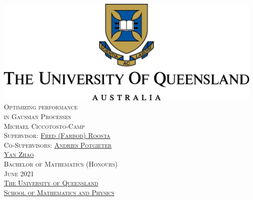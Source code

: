 \documentclass[11pt]{amsart}
\theoremstyle{remark}
\begin{document}
\thispagestyle{empty}
\begin{center}
	\includegraphics{university.png} \\
	\vspace{3cm}
	{\LARGE\textsc{Optimizing performance \\ in Gaussian Processes}} \\
	\vspace{0.3cm}
	{\textsc{Michael Ciccotosto-Camp}} \\
	\vspace{1cm}
	{\textsc{Supervisor: \href{https://people.smp.uq.edu.au/FredRoosta/}{Fred (Farbod) Roosta}}} \\
	{\textsc{Co-Supervisors: \href{https://researchers.uq.edu.au/researcher/2466}{Andries Potgieter} \\ \href{https://researchers.uq.edu.au/researcher/14230}{Yan Zhao}}} \\
	\vspace{5cm}
	{\textsc{Bachelor of Mathematics (Honours)}} \\
	{\textsc{June 2021}} \\
	\vspace{1cm}
	{\textsc{\href{https://www.uq.edu.au/}{The University of Queensland}}} \\
	{\textsc{\href{https://smp.uq.edu.au/}{School of Mathematics and Physics}}}
\end{center}
\newpage



\thispagestyle{empty}
\
\newpage

\tableofcontents
\setlength{\parindent}{0pt} %
\setlength{\parskip}{2mm}
\newpage
\end{document}

